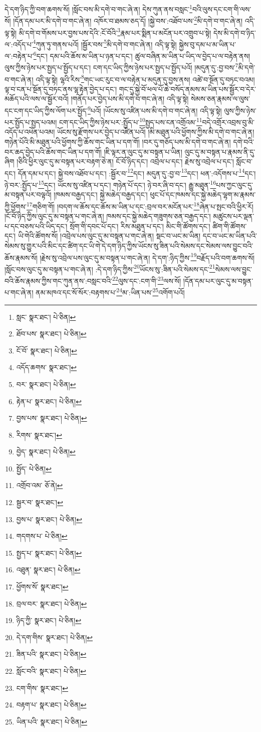 དེ་དག་ཉིད་ཀྱི་བག་ཆགས་སོ། །སློང་བས་མི་དགེ་བ་གང་ཞེ་ན། དེས་ཀུན་ནས་བསླང་\footnote{སླང་  སྣར་ཐང་།  པེ་ཅིན། }བའི་ལུས་དང་ངག་གི་ལས་སོ། །དོན་དམ་པར་མི་དགེ་བ་གང་ཞེ་ན། འཁོར་བ་ཐམས་ཅད་དོ། །སྐྱེ་བས་:འཐོབ་པས་\footnote{ཐོབ་པས་  སྣར་ཐང་།  པེ་ཅིན། }མི་དགེ་བ་གང་ཞེ་ན། འདི་ལྟ་སྟེ། མི་དགེ་བ་གོམས་པར་བྱས་པས་དེའི་:ངོ་བོའི་\footnote{ངོ་བོ་  སྣར་ཐང་།  པེ་ཅིན། }རྣམ་པར་སྨིན་པ་མངོན་པར་འགྲུབ་པ་སྟེ། དེས་མི་དགེ་བ་ཉིད་ལ་:འདོད་པ་\footnote{འདོད་ཆགས་  སྣར་ཐང་། }ཀུན་ཏུ་གནས་པའོ། །སྦྱོར་བས་\footnote{བར་  སྣར་ཐང་།  པེ་ཅིན། }མི་དགེ་བ་གང་ཞེ་ན། འདི་ལྟ་སྟེ། སྐྱེས་བུ་དམ་པ་མ་ཡིན་པ་ལ་:བརྟེན་པ་\footnote{རྟེན་པ་  སྣར་ཐང་།  པེ་ཅིན། }དང་། དམ་པའི་ཆོས་མ་ཡིན་པ་ཉན་པ་དང་། ཚུལ་བཞིན་མ་ཡིན་པ་ཡིད་ལ་བྱེད་པ་ལ་བརྟེན་ནས། ལུས་ཀྱིས་ཉེས་པར་སྤྱད་པ་སྤྱོད་པ་དང་། ངག་དང་ཡིད་ཀྱིས་ཉེས་པར་སྤྱད་པ་སྤྱོད་པའོ། །མདུན་དུ་:བྱ་བས་\footnote{བྱས་པས་  སྣར་ཐང་།  པེ་ཅིན། }མི་དགེ་བ་གང་ཞེ་ན། འདི་ལྟ་སྟེ། ལྷའི་རིས་\footnote{རིགས་  སྣར་ཐང་། }གང་ཡང་རུང་བ་ལ་བརྟེན་པ་མདུན་དུ་བྱས་ནས། འཚེ་བ་སྔོན་དུ་བཏང་བའམ། ལྟ་བ་ངན་པ་སྔོན་དུ་བཏང་ནས་ལྷ་རྟེན་བྱེད་པ་དང་། གང་དུ་སྐྱེ་བོ་ཕལ་པོ་ཆེ་བསོད་ནམས་མ་ཡིན་པས་སྦྱོར་བ་དེར་མཆོད་པའི་ལས་ལ་སྦྱོར་བའོ། །གནོད་པར་བྱེད་པས་མི་དགེ་བ་གང་ཞེ་ན། འདི་ལྟ་སྟེ། སེམས་ཅན་རྣམས་ལ་ལུས་དང་ངག་དང་ཡིད་ཀྱིས་ལོག་པར་སྤྱོད་\footnote{བྱེད་  སྣར་ཐང་།  པེ་ཅིན། }པའོ། །ཡོངས་སུ་འཛིན་པས་མི་དགེ་བ་གང་ཞེ་ན། འདི་ལྟ་སྟེ། ལུས་ཀྱིས་ཉེས་པར་སྤྱོད་པ་སྤྱད་པའམ། ངག་དང་ཡིད་ཀྱིས་ཉེས་པར་:སྤྱོད་པ་\footnote{སྤྱོད་  པེ་ཅིན། }སྤྱད་པས་ངན་འགྲོའམ་\footnote{འགྲོབ་འམ་  ཅོ་ནེ། }བདེ་འགྲོར་འབྲས་བུ་མི་འདོད་པ་འཕེན་པའམ། ཡོངས་སུ་རྫོགས་པར་བྱེད་པ་འཛིན་པའོ། །མི་མཐུན་པའི་ཕྱོགས་ཀྱིས་མི་དགེ་བ་གང་ཞེ་ན། གཉེན་པོའི་མི་མཐུན་པའི་ཕྱོགས་ཀྱི་ཆོས་གང་ཡིན་པ་དག་གོ། །བར་དུ་གཅོད་པས་མི་དགེ་བ་གང་ཞེ་ན། དགེ་བའི་བར་ཆད་བྱེད་པའི་ཆོས་གང་ཡིན་པ་དག་གོ། །ཇི་ལྟར་ན་ལུང་དུ་མ་བསྟན་པ་ཡིན། ལུང་དུ་མ་བསྟན་པ་རྣམས་ནི་དུ་ཞིག །ཅིའི་ཕྱིར་ལུང་དུ་མ་བསྟན་པར་བརྟག་ཅེ་ན། ངོ་བོ་ཉིད་དང་། འབྲེལ་པ་དང་། རྗེས་སུ་འབྲེལ་པ་དང་། སློང་བ་དང་། དོན་དམ་པ་དང་། སྐྱེ་བས་འཐོབ་པ་དང་། :སྦྱོར་བ་\footnote{སྦྱར་བ་  སྣར་ཐང་། }དང་། མདུན་དུ་:བྱ་བ་\footnote{བྱས་པ་  སྣར་ཐང་།  པེ་ཅིན། }དང་། ཕན་:འདོགས་པ་\footnote{གདགས་པ་  པེ་ཅིན། }དང་། ཉེ་བར་:སྤྱོད་པ་\footnote{སྤྱད་པ་  སྣར་ཐང་།  པེ་ཅིན། }དང་། ཡོངས་སུ་འཛིན་པ་དང་། གཉེན་པོ་དང་། ཉེ་བར་ཞི་བ་དང་། རྒྱུ་མཐུན་\footnote{འཐུན་  སྣར་ཐང་།  པེ་ཅིན། }པས་ཀྱང་ལུང་དུ་མ་བསྟན་པར་བལྟའོ། །ཁམས་བརྒྱད་དང་། སྐྱེ་མཆེད་བརྒྱད་དང་། ཕུང་པོ་དང་ཁམས་དང་སྐྱེ་མཆེད་ལྷག་མ་རྣམས་ཀྱི་ཕྱོགས་\footnote{ཕྱོགས་སོ་  སྣར་ཐང་། }གཅིག་གོ། །བདག་ལ་ཆོས་དང་ཆོས་མ་ཡིན་པ་དང་:བྲལ་བར་མངོན་པར་\footnote{བྲལ་བར་  སྣར་ཐང་།  པེ་ཅིན། }ཞེན་པ་སྤང་བའི་ཕྱིར་རོ། །ངོ་བོ་ཉིད་ཀྱིས་ལུང་དུ་མ་བསྟན་པ་གང་ཞེ་ན། ཁམས་དང་སྐྱེ་མཆེད་གཟུགས་ཅན་བརྒྱད་དང་། མཚུངས་པར་ལྡན་པ་དང་བཅས་པའི་ཡིད་དང་། སྲོག་གི་དབང་པོ་དང་། རིས་མཐུན་པ་དང་། མིང་གི་ཚོགས་དང་། ཚིག་གི་ཚོགས་དང་། ཡི་གེའི་ཚོགས་སོ། །འབྲེལ་པས་ལུང་དུ་མ་བསྟན་པ་གང་ཞེ་ན། སྡང་བ་ཡང་མ་ཡིན། དང་བ་ཡང་མ་ཡིན་པའི་སེམས་སུ་གྱུར་པའི་མིང་དང་ཚིག་དང་ཡི་གེ་དེ་དག་ཉིད་ཀྱིས་ཡོངས་སུ་ཟིན་པའི་སེམས་དང་སེམས་ལས་བྱུང་བའི་ཆོས་རྣམས་སོ། །རྗེས་སུ་འབྲེལ་པས་ལུང་དུ་མ་བསྟན་པ་གང་ཞེ་ན། དེ་དག་:ཉིད་ཀྱིས་\footnote{ཉིད་ཀྱི་  སྣར་ཐང་།  པེ་ཅིན། }བརྗོད་པའི་བག་ཆགས་སོ། །སློང་བས་ལུང་དུ་མ་བསྟན་པ་གང་ཞེ་ན། :དེ་དག་ཉིད་ཀྱིས་\footnote{དེ་དག་གིས་  སྣར་ཐང་།  པེ་ཅིན། }ཡོངས་སུ་:ཟིན་པའི་སེམས་དང་\footnote{ཟིན་པའི་  སྣར་ཐང་།  པེ་ཅིན། }སེམས་ལས་བྱུང་བའི་ཆོས་རྣམས་ཀྱིས་གང་ཀུན་ནས་:བསླང་བའི་\footnote{སློང་བའི་  སྣར་ཐང་།  པེ་ཅིན། }ལུས་དང་:ངག་གི་\footnote{ངག་གིས་  སྣར་ཐང་། }ལས་སོ། །དོན་དམ་པར་ལུང་དུ་མ་བསྟན་པ་གང་ཞེ་ན། ནམ་མཁའ་དང་སོ་སོར་:བརྟགས་པ་\footnote{བརྟག་པ་  སྣར་ཐང་།  པེ་ཅིན། }མ་:ཡིན་པས་\footnote{ཡིན་པའི་  སྣར་ཐང་།  པེ་ཅིན། }འགོག་པའོ། 